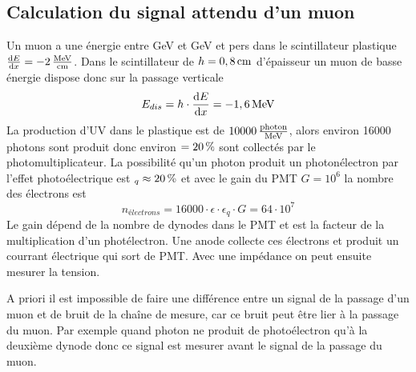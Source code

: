 \documentclass[a4paper,11pt,liststotocnumbered,bibtotocnumbered]{scrartcl}
\begin{document}
  \subsection{Calculation du signal attendu d'un muon}
   Un muon a une énergie entre \unit[1]{GeV} et \unit[1000]{GeV} et pers dans le scintillateur plastique $\frac{\text{d}E}{\text{d}x}=-\unit[2]{\frac{MeV}{cm}}$. Dans le scintillateur de  $h=\unit[0,8]{cm}$ d'épaisseur un muon de basse énergie dispose donc sur la passage verticale
  \begin{equation*}
   E_{dis}=h\cdot\frac{\text{d}E}{\text{d}x}=\unit[-1,6]{MeV}
  \end{equation*}
  La production d'UV dans le plastique est de $\unit[10000]{\frac{photon}{MeV}}$, alors environ 16000 photons sont produit donc environ $\epsilon=\unit[20]{\%}$ sont collectés par le photomultiplicateur. La possibilité qu'un photon produit un photonélectron par l'effet photoélectrique est $\epsilon_q\approx\unit[20]{\%}$ et avec le gain du PMT $G=10^6$ la nombre des électrons est
  \begin{equation}
   n_{électrons}=16000\cdot\epsilon\cdot\epsilon_q\cdot G=64\cdot10^7
  \end{equation}
  Le gain dépend de la nombre de dynodes dans le PMT et est la facteur de la multiplication d'un photélectron. Une anode collecte ces électrons et produit un courrant électrique qui sort de PMT. Avec une impédance on peut ensuite mesurer la tension.


  A priori il est impossible de faire une différence entre un signal de la passage d'un muon et de bruit de la chaîne de mesure, car ce bruit peut être lier à la passage du muon. Par exemple quand photon ne produit de photoélectron qu'à la deuxième dynode donc ce signal est mesurer avant le signal de la passage du muon. 


  
\end{document}
